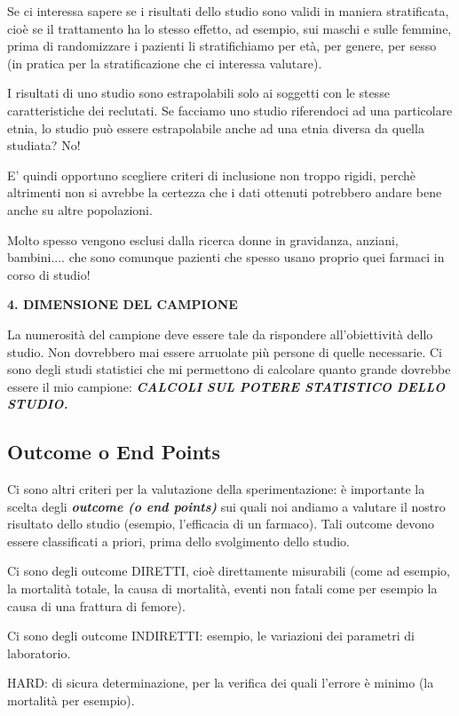 Se ci interessa sapere se i risultati dello studio sono validi in
maniera stratificata, cioè se il trattamento ha lo stesso effetto, ad
esempio, sui maschi e sulle femmine, prima di randomizzare i pazienti li
stratifichiamo per età, per genere, per sesso (in pratica per la
stratificazione che ci interessa valutare).

I risultati di uno studio sono estrapolabili solo ai soggetti con le
stesse caratteristiche dei reclutati. Se facciamo uno studio riferendoci
ad una particolare etnia, lo studio può essere estrapolabile anche ad
una etnia diversa da quella studiata? No!

E' quindi opportuno scegliere criteri di inclusione non troppo rigidi,
perchè altrimenti non si avrebbe la certezza che i dati ottenuti
potrebbero andare bene anche su altre popolazioni.

Molto spesso vengono esclusi dalla ricerca donne in gravidanza, anziani,
bambini.... che sono comunque pazienti che spesso usano proprio quei
farmaci in corso di studio!

\textbf{4. DIMENSIONE DEL CAMPIONE}

La numerosità del campione deve essere tale da rispondere
all'obiettività dello studio. Non dovrebbero mai essere arruolate più
persone di quelle necessarie. Ci sono degli studi statistici che mi
permettono di calcolare quanto grande dovrebbe essere il mio campione:
\textbf{\emph{CALCOLI SUL POTERE STATISTICO DELLO STUDIO.}}

\subsection{Outcome o End Points}

Ci sono altri criteri per la valutazione della sperimentazione: è
importante la scelta degli \textbf{\emph{outcome (o end points)}} sui
quali noi andiamo a valutare il nostro risultato dello studio (esempio,
l'efficacia di un farmaco). Tali outcome devono essere classificati a
priori, prima dello svolgimento dello studio.

Ci sono degli outcome DIRETTI, cioè direttamente misurabili (come ad
esempio, la mortalità totale, la causa di mortalità, eventi non fatali
come per esempio la causa di una frattura di femore).

Ci sono degli outcome INDIRETTI: esempio, le variazioni dei parametri di
laboratorio.

HARD: di sicura determinazione, per la verifica dei quali l'errore è
minimo (la mortalità per esempio).

